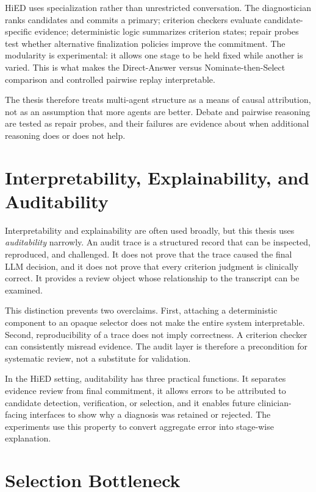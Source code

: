 HiED uses specialization rather than unrestricted conversation. The diagnostician ranks candidates and commits a primary; criterion checkers evaluate candidate-specific evidence; deterministic logic summarizes criterion states; repair probes test whether alternative finalization policies improve the commitment. The modularity is experimental: it allows one stage to be held fixed while another is varied. This is what makes the Direct-Answer versus Nominate-then-Select comparison and controlled pairwise replay interpretable.

The thesis therefore treats multi-agent structure as a means of causal attribution, not as an assumption that more agents are better. Debate and pairwise reasoning are tested as repair probes, and their failures are evidence about when additional reasoning does or does not help.

\section{Interpretability, Explainability, and Auditability}

Interpretability and explainability are often used broadly, but this thesis uses \emph{auditability} narrowly. An audit trace is a structured record that can be inspected, reproduced, and challenged. It does not prove that the trace caused the final LLM decision, and it does not prove that every criterion judgment is clinically correct. It provides a review object whose relationship to the transcript can be examined.

This distinction prevents two overclaims. First, attaching a deterministic component to an opaque selector does not make the entire system interpretable. Second, reproducibility of a trace does not imply correctness. A criterion checker can consistently misread evidence. The audit layer is therefore a precondition for systematic review, not a substitute for validation.

In the HiED setting, auditability has three practical functions. It separates evidence review from final commitment, it allows errors to be attributed to candidate detection, verification, or selection, and it enables future clinician-facing interfaces to show why a diagnosis was retained or rejected. The experiments use this property to convert aggregate error into stage-wise explanation.

\section{Selection Bottleneck}

